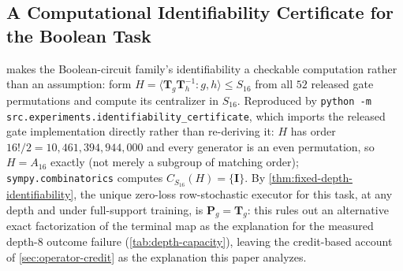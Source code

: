 \subsection{A Computational Identifiability Certificate for the Boolean Task}
\label{app:identifiability-certificate}

 makes the Boolean-circuit family's
identifiability a checkable computation rather than an assumption: form
$H=\langle\bm T_g\bm T_h^{-1}:g,h\rangle\le S_{16}$ from all $52$ released
gate permutations and compute its centralizer in $S_{16}$. Reproduced by
\texttt{python -m src.experiments.identifiability\_certificate}, which
imports the released gate implementation directly rather than
re-deriving it: $H$ has order $16!/2=10{,}461{,}394{,}944{,}000$ and every
generator is an even permutation, so $H=A_{16}$ exactly (not merely a
subgroup of matching order); \texttt{sympy.combinatorics} computes
$C_{S_{16}}(H)=\{\bm I\}$. By \cref{thm:fixed-depth-identifiability}, the
unique zero-loss row-stochastic executor for this task, at any depth and
under full-support training, is $\bm P_g=\bm T_g$: this rules out an
alternative exact factorization of the terminal map as the explanation for
the measured depth-$8$ outcome failure (\cref{tab:depth-capacity}), leaving
the credit-based account of \cref{sec:operator-credit} as the explanation
this paper analyzes.
